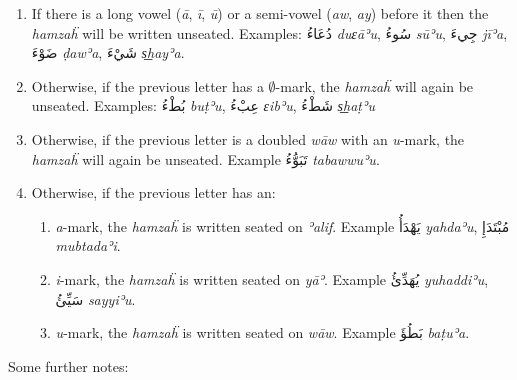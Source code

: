 \documentclass[
  10pt,
]{book}
\providecommand{\tightlist}{%
  \setlength{\itemsep}{0pt}\setlength{\parskip}{0pt}}
\begin{document}
\begin{enumerate}
  \begin{enumerate}
  \def\labelenumii{\alph{enumii}.}
  \tightlist
  \item
    If there is a long vowel (\emph{ā}, \emph{ī}, \emph{ū}) or a semi-vowel (\emph{aw}, \emph{ay}) before it then the \emph{hamzaḧ} will be written unseated. Examples: \foreignlanguage{arabic}{دُعَاءُ} \emph{duɛāʾu}, \foreignlanguage{arabic}{سُوءُ} \emph{sūʾu}, \foreignlanguage{arabic}{جِيءَ} \emph{jīʾa}, \foreignlanguage{arabic}{ضَوْءَ} \emph{ḍawʾa}, \foreignlanguage{arabic}{شَيْءَ} \emph{s͟hayʾa}.
  \item
    Otherwise, if the previous letter has a \(\emptyset\)-mark, the \emph{hamzaḧ} will again be unseated. Examples: \foreignlanguage{arabic}{بُطْءُ} \emph{buṭʾu}, \foreignlanguage{arabic}{عِبْءُ} \emph{ɛibʾu}, \foreignlanguage{arabic}{شَطْءُ} \emph{s͟haṭʾu}
  \item
    Otherwise, if the previous letter is a doubled \emph{wāw} with an \emph{u}-mark, the \emph{hamzaḧ} will again be unseated. Example \foreignlanguage{arabic}{تَبَوُّءُ} \emph{tabawwuʾu}.
  \item
    Otherwise, if the previous letter has an:

    \begin{enumerate}
    \def\labelenumiii{\roman{enumiii}.}
    \tightlist
    \item
      \emph{a}-mark, the \emph{hamzaḧ} is written seated on \emph{ʾalif}. Example \foreignlanguage{arabic}{يَهْدَأُ} \emph{yahdaʾu}, \foreignlanguage{arabic}{مُبْتَدَإِ} \emph{mubtadaʾi}.
    \item
      \emph{i}-mark, the \emph{hamzaḧ} is written seated on \emph{yāʾ}. Example \foreignlanguage{arabic}{يُهَدِّئُ} \emph{yuhaddiʾu}, \foreignlanguage{arabic}{سَيِّئُ} \emph{sayyiʾu}.
    \item
      \emph{u}-mark, the \emph{hamzaḧ} is written seated on \emph{wāw}. Example \foreignlanguage{arabic}{بَطُؤَ} \emph{baṭuʾa}.
    \end{enumerate}
  \end{enumerate}
\end{enumerate}

Some further notes:
\end{document}
